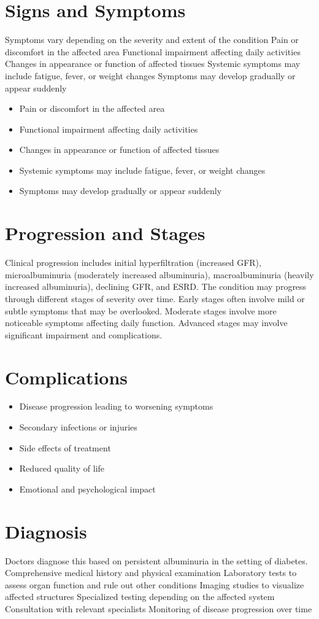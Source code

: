 \section{Signs and Symptoms}
Symptoms vary depending on the severity and extent of the condition Pain or discomfort in the affected area Functional impairment affecting daily activities Changes in appearance or function of affected tissues Systemic symptoms may include fatigue, fever, or weight changes Symptoms may develop gradually or appear suddenly

\begin{itemize}[noitemsep]
  \item Pain or discomfort in the affected area
  \item Functional impairment affecting daily activities
  \item Changes in appearance or function of affected tissues
  \item Systemic symptoms may include fatigue, fever, or weight changes
  \item Symptoms may develop gradually or appear suddenly
\end{itemize}
\section{Progression and Stages}
Clinical progression includes initial hyperfiltration (increased GFR), microalbuminuria (moderately increased albuminuria), macroalbuminuria (heavily increased albuminuria), declining GFR, and ESRD. The condition may progress through different stages of severity over time. Early stages often involve mild or subtle symptoms that may be overlooked. Moderate stages involve more noticeable symptoms affecting daily function. Advanced stages may involve significant impairment and complications.
\section{Complications}
\begin{itemize}[noitemsep]
  \item Disease progression leading to worsening symptoms
  \item Secondary infections or injuries
  \item Side effects of treatment
  \item Reduced quality of life
  \item Emotional and psychological impact
\end{itemize}
\section{Diagnosis}
Doctors diagnose this based on persistent albuminuria in the setting of diabetes. Comprehensive medical history and physical examination Laboratory tests to assess organ function and rule out other conditions Imaging studies to visualize affected structures Specialized testing depending on the affected system Consultation with relevant specialists Monitoring of disease progression over time

